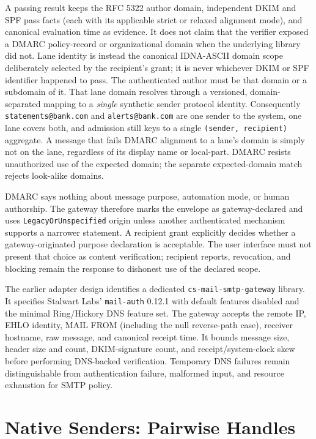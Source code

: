 \documentclass[11pt]{article}
\begin{document}
{\sloppy
A passing result keeps the RFC 5322 author domain, independent DKIM and SPF pass
facts (each with its applicable strict or relaxed alignment mode), and canonical
evaluation time as evidence. It does not claim that the verifier exposed a DMARC
policy-record or organizational domain when the underlying library did not. Lane
identity is instead the canonical IDNA-ASCII domain scope deliberately selected
by the recipient's grant; it is never whichever DKIM or SPF identifier happened
to pass. The authenticated author must be that domain or a subdomain of it. That
lane domain resolves through a versioned, domain-separated mapping to
a \emph{single} synthetic sender protocol identity.
Consequently \texttt{statements@bank.com} and \texttt{alerts@bank.com} are one
sender to the system, one lane covers both, and admission still keys to a single
\texttt{(sender, recipient)} aggregate. A message that fails DMARC alignment to a
lane's domain is simply not on the lane, regardless of its display name or
local-part. DMARC resists unauthorized use of the expected domain; the separate
expected-domain match rejects look-alike domains.\par}

DMARC says nothing about message purpose, automation mode, or human authorship.
The gateway therefore marks the envelope as gateway-declared and uses
\texttt{LegacyOrUnspecified} origin unless another authenticated mechanism
supports a narrower statement. A recipient grant explicitly decides whether a
gateway-originated purpose declaration is acceptable. The user interface must not
present that choice as content verification; recipient reports, revocation, and
blocking remain the response to dishonest use of the declared scope.

The earlier adapter design identifies a dedicated \texttt{cs-mail-smtp-gateway} library. It specifies
Stalwart Labs' \texttt{mail-auth} 0.12.1 with default features disabled and the
minimal Ring/Hickory DNS feature set. The gateway accepts the remote IP,
EHLO identity, MAIL FROM (including the null reverse-path case), receiver hostname,
raw message, and canonical receipt time. It bounds message size, header size and
count, DKIM-signature count, and receipt/system-clock skew before performing
DNS-backed verification. Temporary DNS failures remain distinguishable from
authentication failure, malformed input, and resource exhaustion for SMTP policy.

\section{Native Senders: Pairwise Handles}
\end{document}

